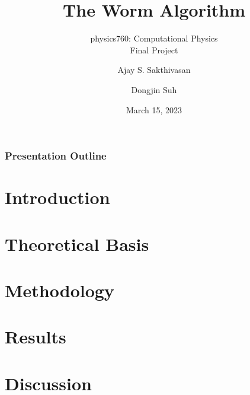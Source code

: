 \documentclass{beamer}
\title{The Worm Algorithm}
\subtitle{physics760: Computational Physics\\Final Project}
\author{Ajay S. Sakthivasan \and Dongjin Suh}
\institute{Universität Bonn}
\date{March 15, 2023}
\begin{document}
\begin{frame}
    \titlepage
\end{frame}

\begin{frame}
    \frametitle{Presentation Outline}
    \tableofcontents
\end{frame}

\section{Introduction}

\section{Theoretical Basis}

\section{Methodology}

\section{Results}

\section{Discussion}
\end{document}

